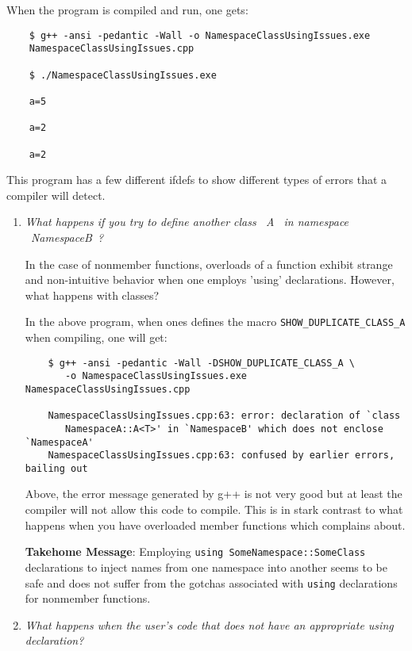 When the program is compiled and run, one gets:

{\small\begin{verbatim}
    $ g++ -ansi -pedantic -Wall -o NamespaceClassUsingIssues.exe
    NamespaceClassUsingIssues.cpp
    
    $ ./NamespaceClassUsingIssues.exe 
    
    a=5
    
    a=2
    
    a=2
\end{verbatim}}

This program has a few different ifdefs to show different types of errors that
a compiler will detect.

\begin{enumerate}

{}\item\textit{What happens if you try to define another class ~A~ in
namespace ~NamespaceB~?}

In the case of nonmember functions, overloads of a function exhibit strange
and non-intuitive behavior when one employs 'using' declarations.  However,
what happens with classes?

In the above program, when ones defines the macro
{}\texttt{SHOW\-\_DUPLICATE\-\_CLASS\-\_A} when compiling, one will get:

{\small\begin{verbatim}
    $ g++ -ansi -pedantic -Wall -DSHOW_DUPLICATE_CLASS_A \
       -o NamespaceClassUsingIssues.exe NamespaceClassUsingIssues.cpp             

    NamespaceClassUsingIssues.cpp:63: error: declaration of `class 
       NamespaceA::A<T>' in `NamespaceB' which does not enclose `NamespaceA'
    NamespaceClassUsingIssues.cpp:63: confused by earlier errors, bailing out
\end{verbatim}}

Above, the error message generated by g++ is not very good but at least the
compiler will not allow this code to compile.  This is in stark contrast to
what happens when you have overloaded member functions which {}\cite[Item
59]{C++CodingStandards05} complains about.

{}\textbf{Takehome Message}: Employing {}\texttt{using
SomeNamespace::SomeClass} declarations to inject names from one namespace into
another seems to be safe and does not suffer from the gotchas associated with
{}\texttt{using} declarations for nonmember functions.

{}\item\textit{What happens when the user's code that does not have an
appropriate using declaration?}


\end{enumerate}
